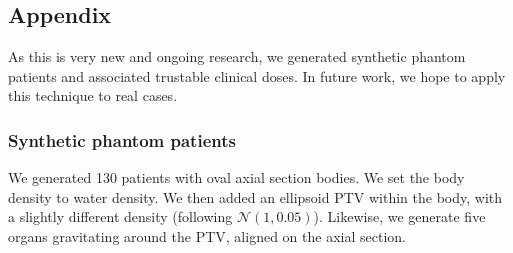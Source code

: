 \subsection*{Appendix}
As this is very new and ongoing research, we generated synthetic phantom patients and associated trustable clinical doses.
In future work, we hope to apply this technique to real cases.

\subsubsection*{Synthetic phantom patients}
We generated 130 patients with oval axial section bodies.
We set the body density to water density.
We then added an ellipsoid PTV within the body, with a slightly different density (following $\mathcal{N}(1,0.05)$).
Likewise, we generate five organs gravitating around the PTV, aligned on the axial section.

